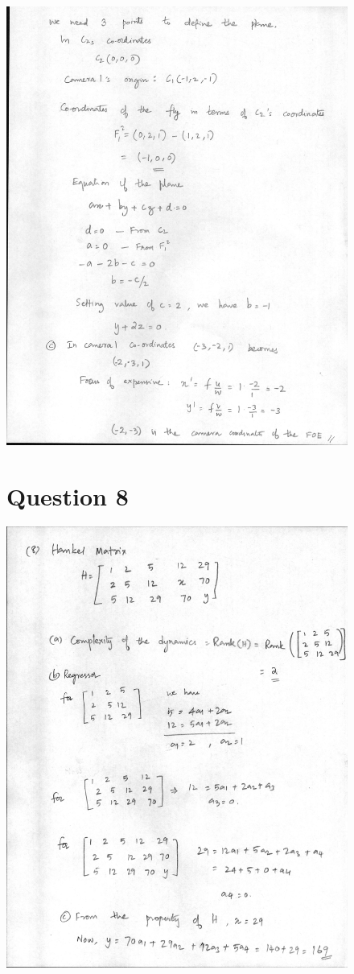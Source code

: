 \documentclass{article}
\begin{document}
\begin{figure}
\includegraphics[width=15cm]{5.jpg}
\end{figure}

\begin{figure}
\section*{Question 8}  
\includegraphics[width=15cm]{6.jpg}
\end{figure}
\end{document}
